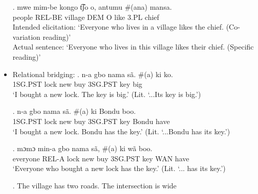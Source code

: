 \documentclass{assets/fieldnotes}
\begin{document}
\begin{itemize}
    
    \exg. mwe mim-be kongo t͡ʃo o, antumu \#(ana) mansa.\\
        people REL-BE village DEM O like 3.PL chief\\
    Intended elicitation: `Everyone who lives in a village likes the chief. (Co-variation reading)'\\
    Actual sentence: `Everyone who lives in this village likes their chief. (Specific reading)'

    \item Relational bridging:
    \exg. n-a gbo nama sã. \#(a) ki ko.\\
        1SG.PST lock new buy 3SG.PST key big\\
        `I bought a new lock. The key is big.' (Lit. `...Its key is big.')

    \exg. n-a gbo nama sã. \#(a) ki Bondu boo.\\
        1SG.PST lock new buy 3SG.PST key Bondu have\\
        `I bought a new lock. Bondu has the key.' (Lit. `...Bondu has its key.')

    \exg. mɔmɔ min-a gbo nama sã, \#(a) ki wã boo.\\
        everyone REL-A lock new buy 3SG.PST key WAN have\\
        `Everyone who bought a new lock has the key.' (Lit. `... has its key.')

\ex. The village has two roads. The intersection is wide

 
\end{itemize}
\end{document}

